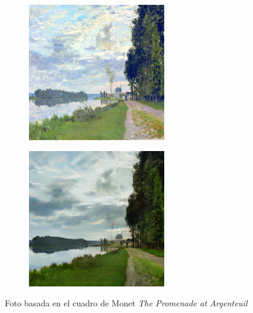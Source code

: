 \documentclass[[../main.tex]{subfiles}
\begin{document}
        \begin{figure}[!htb]
            \begin{subfigure}[b]{0.49\textwidth}
            \includegraphics[width=0.65\textwidth]{imagenes/cuadro2imagen/monet/00900.jpg}
            \end{subfigure}
        \hfill
            \begin{subfigure}[b]{0.49\textwidth}
            \includegraphics[width=0.65\textwidth]{imagenes/cuadro2imagen/monet/00900_2.jpg}
            \end{subfigure}
        \caption{Foto basada en el cuadro de Monet \textit{The Promenade at Argenteuil}}
        \label{fig:monet_foto_Argenteuil}
        \end{figure}
        
\end{document}
